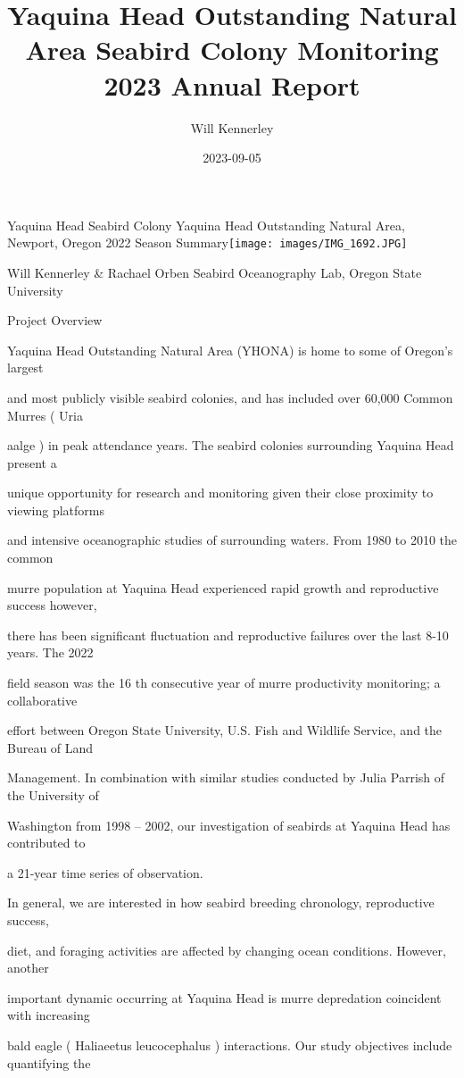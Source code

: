 \documentclass[
]{article}
\title{Yaquina Head Outstanding Natural Area Seabird Colony Monitoring
2023 Annual Report}
\author{Will Kennerley}
\date{2023-09-05}
\begin{document}
\maketitle

Yaquina Head Seabird Colony Yaquina Head Outstanding Natural Area,
Newport, Oregon 2022 Season Summary\texttt{[image: images/IMG\_1692.JPG]}

Will Kennerley \& Rachael Orben Seabird Oceanography Lab, Oregon State
University

Project Overview

Yaquina Head Outstanding Natural Area (YHONA) is home to some of
Oregon's largest

and most publicly visible seabird colonies, and has included over 60,000
Common Murres ( Uria

aalge ) in peak attendance years. The seabird colonies surrounding
Yaquina Head present a

unique opportunity for research and monitoring given their close
proximity to viewing platforms

and intensive oceanographic studies of surrounding waters. From 1980 to
2010 the common

murre population at Yaquina Head experienced rapid growth and
reproductive success however,

there has been significant fluctuation and reproductive failures over
the last 8-10 years. The 2022

field season was the 16 th consecutive year of murre productivity
monitoring; a collaborative

effort between Oregon State University, U.S. Fish and Wildlife Service,
and the Bureau of Land

Management. In combination with similar studies conducted by Julia
Parrish of the University of

Washington from 1998 -- 2002, our investigation of seabirds at Yaquina
Head has contributed to

a 21-year time series of observation.

In general, we are interested in how seabird breeding chronology,
reproductive success,

diet, and foraging activities are affected by changing ocean conditions.
However, another

important dynamic occurring at Yaquina Head is murre depredation
coincident with increasing

bald eagle ( Haliaeetus leucocephalus ) interactions. Our study
objectives include quantifying the
\end{document}
